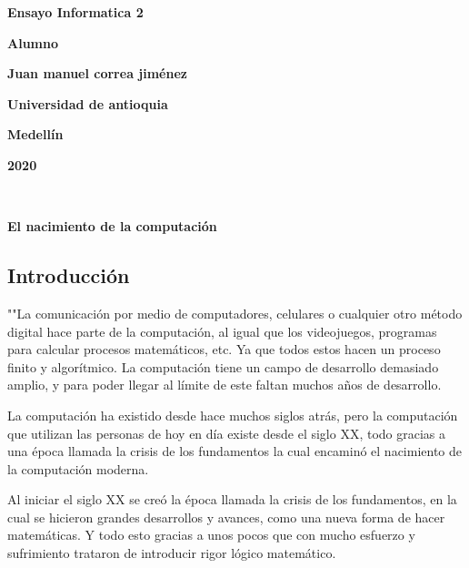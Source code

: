 \documentclass[12pt]{article}
\begin{document}
\begin{center}
\bf{\sc\Huge Ensayo Informatica 2}\\
\end{center}
\vspace{120pt}
\begin{center}
\bf{\sc\Huge Alumno}    
\end{center}
\begin{center}
\bf{\sc\Huge Juan manuel correa jiménez}\\
\end{center}
\vspace{200pt}
\begin{center}
\bf{\sc\Huge Universidad de antioquia}    
\end{center}
\begin{center}
\bf{\sc\Huge Medellín}
\end{center}
\begin{center}
\bf{\sc\Huge 2020}\\
\end{center}\
\newpage



\begin{center}

\bf{\sc\Huge El nacimiento de la computación }\\
\end{center}
\begin{flushleft}
\vspace{25PT}
\large
\section{Introducción}
""La comunicación por medio de computadores, celulares o cualquier otro método digital hace parte de la computación, al igual que los videojuegos, programas para calcular procesos matemáticos, etc. 	Ya que todos estos hacen un proceso finito y algorítmico. La computación tiene un campo de desarrollo demasiado amplio, y para poder llegar al límite de este faltan muchos años de desarrollo.

\vspace{15PT}
La computación ha existido desde hace muchos siglos atrás, pero la computación que utilizan las personas de hoy en día existe desde el siglo XX, todo gracias a una época llamada la crisis de los fundamentos la cual encaminó el nacimiento de la computación moderna.
\end{flushleft}
\newpage

\large
Al iniciar el siglo XX se creó la época llamada la crisis de los fundamentos, en la cual se hicieron grandes desarrollos y avances, como una nueva forma de hacer matemáticas. Y todo esto gracias a unos pocos que con mucho esfuerzo y sufrimiento trataron de introducir rigor lógico matemático.
\end{document}
